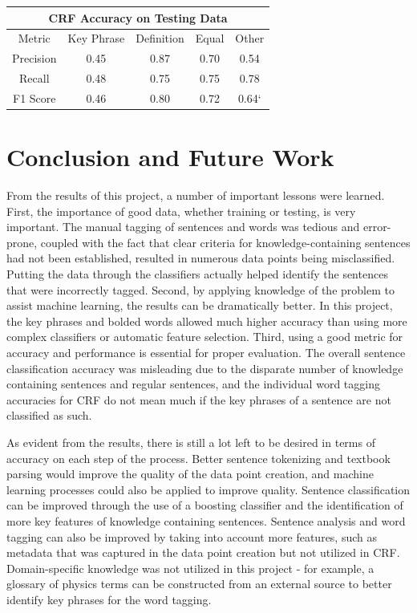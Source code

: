 \documentclass{article} %
\begin{document}
\vspace{2em}

\begin{center}
 \label{tab:crf-testing-results} 
\begin{tabular}{ |c||c|c|c|c| }
	\hline
	\multicolumn{5}{|c|}{CRF Accuracy on Testing Data} \\
	\hline
	Metric & Key Phrase & Definition & Equal & Other \\
	\hline
	Precision & 0.45 & 0.87 & 0.70 & 0.54 \\
	Recall & 0.48 & 0.75 & 0.75 & 0.78 \\
	F1 Score & 0.46 & 0.80 & 0.72 & 0.64` \\
	\hline
\end{tabular}
\end{center}


\section{Conclusion and Future Work}

From the results of this project, a number of important lessons were learned. First, the importance of good data, whether training or testing, is very important. The manual tagging of sentences and words was tedious and error-prone, coupled with the fact that clear criteria for knowledge-containing sentences had not been established, resulted in numerous data points being misclassified. Putting the data through the classifiers actually helped identify the sentences that were incorrectly tagged. Second, by applying knowledge of the problem to assist machine learning, the results can be dramatically better. In this project, the key phrases and bolded words allowed much higher accuracy than using more complex classifiers or automatic feature selection. Third, using a good metric for accuracy and performance is essential for proper evaluation. The overall sentence classification accuracy was misleading due to the disparate number of knowledge containing sentences and regular sentences, and the individual word tagging accuracies for CRF do not mean much if the key phrases of a sentence are not classified as such.

As evident from the results, there is still a lot left to be desired in terms of accuracy on each step of the process. Better sentence tokenizing and textbook parsing would improve the quality of the data point creation, and machine learning processes could also be applied to improve quality. Sentence classification can be improved through the use of a boosting classifier and the identification of more key features of knowledge containing sentences. Sentence analysis and word tagging can also be improved by taking into account more features, such as metadata that was captured in the data point creation but not utilized in CRF. Domain-specific knowledge was not utilized in this project - for example, a glossary of physics terms can be constructed from an external source to better identify key phrases for the word tagging.
\end{document}

